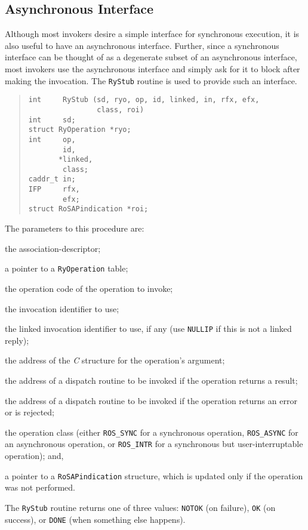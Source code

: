 \subsection*	{Asynchronous Interface}
Although
most invokers desire a simple interface for synchronous execution,
it is also useful to have an asynchronous interface.
Further,
since a synchronous interface can be thought of as a degenerate subset of an
asynchronous interface,
most invokers use the asynchronous interface and simply ask for it to block
after making the invocation.
The \verb"RyStub" routine is used to provide such an interface.
\begin{quote}\small\begin{verbatim}
int     RyStub (sd, ryo, op, id, linked, in, rfx, efx,
                class, roi)
int     sd;
struct RyOperation *ryo;
int     op,
        id,
       *linked,
        class;
caddr_t in;
IFP     rfx,
        efx;
struct RoSAPindication *roi;
\end{verbatim}\end{quote}
The parameters to this procedure are:
\begin{describe}
\item[\verb"sd":] the association-descriptor;

\item[\verb"ryo":] a pointer to a \verb"RyOperation" table;

\item[\verb"op":] the operation code of the operation to invoke;

\item[\verb"id":] the invocation identifier to use;

\item[\verb"linked":] the linked invocation identifier to use, if any
(use \verb"NULLIP" if this is not a linked reply);

\item[\verb"in":] the address of the {\em C\/} structure for the operation's
argument;

\item[\verb"rfx":] the address of a dispatch routine to be invoked if
the operation returns a result;

\item[\verb"efx":] the address of a dispatch routine to be invoked if
the operation returns an error or is rejected;

\item[\verb"class":] the operation class
(either \verb"ROS_SYNC" for a synchronous operation,
\verb"ROS_ASYNC" for an asynchronous operation,
or \verb"ROS_INTR" for a synchronous but user-interruptable operation);
and,

\item[\verb"roi":] a pointer to a \verb"RoSAPindication" structure,
which is updated only if the operation was not performed.
\end{describe}
The \verb"RyStub" routine returns one of three values:
\verb"NOTOK" (on failure),
\verb"OK" (on success),
or
\verb"DONE" (when something else happens).


